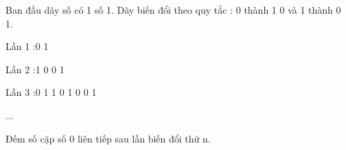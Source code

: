 Ban đầu dãy số có 1 số 1. Dãy biến đổi theo quy tắc : 0 thành 1 0 và 1 thành 0 1.

Lần 1 :0 1

Lần 2 :1 0 0 1

Lần 3 :0 1 1 0 1 0 0 1

...

Đếm số cặp số 0 liên tiếp sau lần biến đổi thứ n.

\